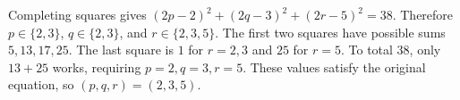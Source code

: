 Completing squares gives $(2p-2)^2+(2q-3)^2+(2r-5)^2=38$. Therefore $p\in\{2,3\}$, $q\in\{2,3\}$, and $r\in\{2,3,5\}$. The first two squares have possible sums $5,13,17,25$. The last square is $1$ for $r=2,3$ and $25$ for $r=5$. To total $38$, only $13+25$ works, requiring $p=2,q=3,r=5$. These values satisfy the original equation, so $\boxed{(p,q,r)=(2,3,5)}$.
